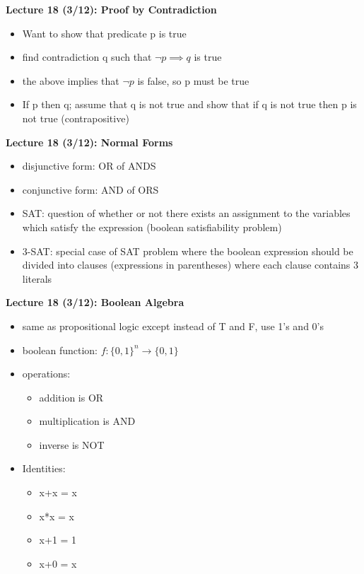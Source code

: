 \documentclass[twocolumn]{article}
\begin{document}
\textbf{Lecture 18 (3/12): Proof by Contradiction}
\begin{itemize}
    \item Want to show that predicate p is true
    \item find contradiction q such that $\lnot p \implies q$ is true
    \item the above implies that $\lnot p$ is false, so p must be true
    \item If p then q; assume that q is not true and show that if q is not true then p is not true (contrapositive)
\end{itemize}

\textbf{Lecture 18 (3/12): Normal Forms}
\begin{itemize}
    \item disjunctive form: OR of ANDS
    \item conjunctive form: AND of ORS
    \item SAT: question of whether or not there exists an assignment to the variables which satisfy the expression (boolean satisfiability problem)
    \item 3-SAT: special case of SAT problem where the boolean expression should be divided into clauses (expressions in parentheses) where each clause contains 3 literals
\end{itemize}

\textbf{Lecture 18 (3/12): Boolean Algebra}
\begin{itemize}
    \item same as propositional logic except instead of T and F, use 1's and 0's
    \item boolean function: $f: \{ 0, 1\}^n \rightarrow \{ 0, 1\}$
    \item operations:
    \begin{itemize}
        \item addition is OR
        \item multiplication is AND
        \item inverse is NOT
    \end{itemize}
    \item Identities:
    \begin{itemize}
        \item x+x = x
        \item x*x = x
        \item x+1 = 1
        \item x+0 = x
    \end{itemize}
\end{itemize}
\end{document}
